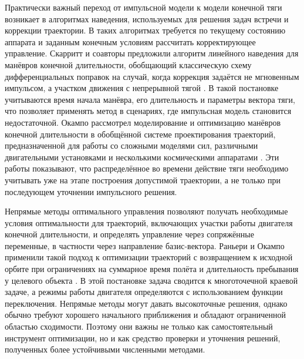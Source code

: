 Практически важный переход от импульсной модели к модели конечной тяги возникает в алгоритмах наведения, используемых для решения задач встречи и коррекции траектории. В таких алгоритмах требуется по текущему состоянию аппарата и заданным конечным условиям рассчитать корректирующее управление. Скарритт и соавторы предложили алгоритм линейного наведения для манёвров конечной длительности, обобщающий классическую схему дифференциальных поправок на случай, когда коррекция задаётся не мгновенным импульсом, а участком движения с непрерывной тягой \cite{scarritt2012finite}. В такой постановке учитываются время начала манёвра, его длительность и параметры вектора тяги, что позволяет применять метод в сценариях, где импульсная модель становится недостаточной. Окампо рассмотрел моделирование и оптимизацию манёвров конечной длительности в обобщённой системе проектирования траекторий, предназначенной для работы со сложными моделями сил, различными двигательными установками и несколькими космическими аппаратами \cite{ocampo2004finite}. Эти работы показывают, что распределённое во времени действие тяги необходимо учитывать уже на этапе построения допустимой траектории, а не только при последующем уточнении импульсного решения.

Непрямые методы оптимального управления позволяют получать необходимые условия оптимальности для траекторий, включающих участки работы двигателя конечной длительности, и определять управление через сопряжённые переменные, в частности через направление базис-вектора. Раньери и Окампо применили такой подход к оптимизации траекторий с возвращением к исходной орбите при ограничениях на суммарное время полёта и длительность пребывания у целевого объекта \cite{ranieri2005optimization}. В этой постановке задача сводится к многоточечной краевой задаче, а режимы работы двигателя определяются с использованием функции переключения. Непрямые методы могут давать высокоточные решения, однако обычно требуют хорошего начального приближения и обладают ограниченной областью сходимости. Поэтому они важны не только как самостоятельный инструмент оптимизации, но и как средство проверки и уточнения решений, полученных более устойчивыми численными методами.

